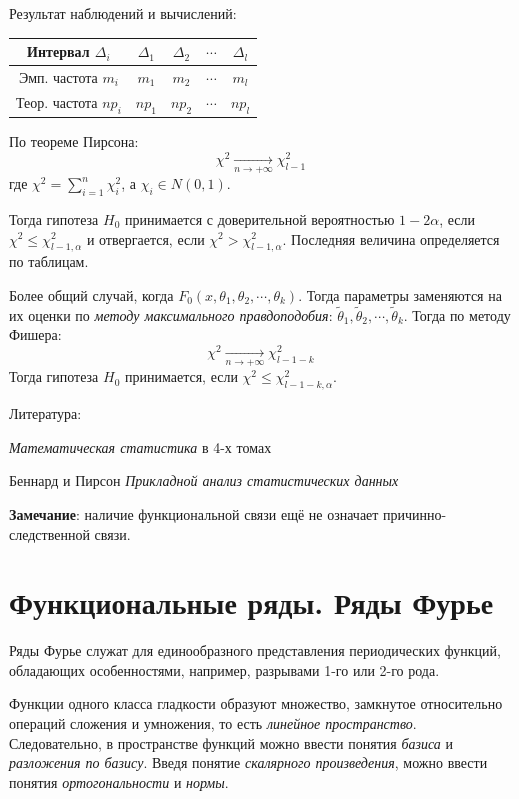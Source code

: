 \documentclass[12pt, a4paper]{article}
\begin{document}
Результат наблюдений и вычислений:
\begin{center}
\begin{tabular}{|c|cccc|}
\hline
Интервал $\Delta_i$ & $\Delta_1$ & $\Delta_2$ & $\cdots$ & $\Delta_l$ \\
\hline
Эмп. частота $m_i$ & $m_1$ & $m_2$ & $\cdots$ & $m_l$ \\
\hline
Теор. частота $np_i$ & $np_1$ & $np_2$ & $\cdots$ & $np_l$ \\
\hline
\end{tabular}
\end{center}

По теореме Пирсона:
\[\chi^2 \xrightarrow[n \to +\infty]{} \chi^2_{l-1} \]
где $\chi^2 = \sum_{i=1}^n \chi^2_i$, а $\chi_i \in N(0, 1)$.

Тогда гипотеза $H_0$ принимается с доверительной вероятностью $1-2\alpha$, если $\chi^2 \leq \chi^2_{l-1, \alpha}$ и отвергается, если $\chi^2 > \chi^2_{l-1, \alpha}$. Последняя величина определяется по таблицам.

Более общий случай, когда $F_0(x, \theta_1, \theta_2, \cdots, \theta_k)$. Тогда параметры заменяются на их оценки по \textit{методу максимального правдоподобия}: $\tilde{\theta}_1, \tilde{\theta}_2, \cdots, \tilde{\theta}_k$. Тогда по методу Фишера:
\[\chi^2 \xrightarrow[n \to +\infty]{} \chi^2_{l-1-k} \]
Тогда гипотеза $H_0$ принимается, если $\chi^2 \leq \chi^2_{l-1-k, \alpha}$.
\newpage

\begin{center}
Литература:
\end{center}
\noindent
\textit{Математическая статистика} в 4-х томах

\noindent
Беннард и Пирсон \textit{Прикладной анализ статистических данных}

\textbf{Замечание}: наличие функциональной связи ещё не означает причинно-следственной связи.

\section{Функциональные ряды. Ряды Фурье}

Ряды Фурье служат для единообразного представления периодических функций, обладающих особенностями, например, разрывами 1-го или 2-го рода.

Функции одного класса гладкости образуют множество, замкнутое относительно операций сложения и умножения, то есть \textit{линейное пространство}. Следовательно, в пространстве функций можно ввести понятия \textit{базиса} и \textit{разложения по базису}. Введя понятие \textit{скалярного произведения}, можно ввести понятия \textit{ортогональности} и \textit{нормы}.
\end{document}

